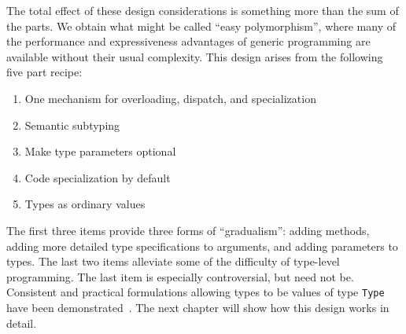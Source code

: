 

The total effect of these design considerations is something more than the
sum of the parts.
We obtain what might be called ``easy polymorphism'', where many of the performance
and expressiveness advantages of generic programming are available without
their usual complexity.
This design arises from the following five part recipe:

\vspace{-3ex}
\begin{singlespace}
\begin{enumerate}
\item One mechanism for overloading, dispatch, and specialization
\item Semantic subtyping
\item Make type parameters optional
\item Code specialization by default
\item Types as ordinary values
\end{enumerate}
\end{singlespace}

\noindent
The first three items provide three forms of ``gradualism'':
adding methods, adding more detailed type specifications to arguments,
and adding parameters to types.
The last two items alleviate some of the difficulty of type-level
programming.
The last item is especially controversial, but need not be.
Consistent and practical formulations allowing types to be values of
type \texttt{Type} have been demonstrated~\cite{cardelli1986polymorphic}.
The next chapter will show how this design works in detail.


